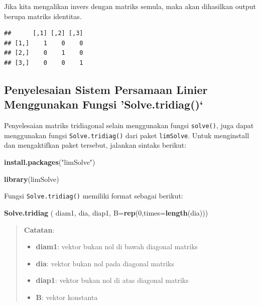\documentclass[]{book}
\newenvironment{Shaded}{\begin{snugshade}}{\end{snugshade}}
\newcommand{\DataTypeTok}[1]{\textcolor[rgb]{0.13,0.29,0.53}{#1}}
\newcommand{\DecValTok}[1]{\textcolor[rgb]{0.00,0.00,0.81}{#1}}
\newcommand{\KeywordTok}[1]{\textcolor[rgb]{0.13,0.29,0.53}{\textbf{#1}}}
\newcommand{\NormalTok}[1]{#1}
\newcommand{\OperatorTok}[1]{\textcolor[rgb]{0.81,0.36,0.00}{\textbf{#1}}}
\newcommand{\StringTok}[1]{\textcolor[rgb]{0.31,0.60,0.02}{#1}}
\providecommand{\tightlist}{%
  \setlength{\itemsep}{0pt}\setlength{\parskip}{0pt}}
\theoremstyle{definition}
\theoremstyle{definition}
\theoremstyle{definition}
\theoremstyle{remark}
\begin{document}
Jika kita mengalikan invers dengan matriks semula, maka akan dihasilkan output berupa matriks identitas.

\begin{Shaded}
\end{Shaded}

\begin{verbatim}
##      [,1] [,2] [,3]
## [1,]    1    0    0
## [2,]    0    1    0
## [3,]    0    0    1
\end{verbatim}

\hypertarget{solvetridiagfunct}{%
\subsection{Penyelesaian Sistem Persamaan Linier Menggunakan Fungsi 'Solve.tridiag()`}\label{solvetridiagfunct}}

Penyelesaian matriks tridiagonal selain menggunakan fungsi \texttt{solve()}, juga dapat menggunakan fungsi \texttt{Solve.tridiag()} dari paket \texttt{limSolve}. Untuk menginstall dan mengaktifkan paket tersebut, jalankan sintaks berikut:

\begin{Shaded}
\begin{Highlighting}[]
\KeywordTok{install.packages}\NormalTok{(}\StringTok{"limSolve"}\NormalTok{)}
\end{Highlighting}
\end{Shaded}

\begin{Shaded}
\begin{Highlighting}[]
\KeywordTok{library}\NormalTok{(limSolve)}
\end{Highlighting}
\end{Shaded}

Fungsi \texttt{Solve.tridiag()} memiliki format sebagai berikut:

\begin{Shaded}
\begin{Highlighting}[]
\KeywordTok{Solve.tridiag}\NormalTok{ ( diam1, dia, diap1, }\DataTypeTok{B=}\KeywordTok{rep}\NormalTok{(}\DecValTok{0}\NormalTok{,}\DataTypeTok{times=}\KeywordTok{length}\NormalTok{(dia)))}
\end{Highlighting}
\end{Shaded}

\begin{quote}
\textbf{Catatan}:

\begin{itemize}
\tightlist
\item
  \textbf{diam1}: vektor bukan nol di bawah diagonal matriks
\item
  \textbf{dia}: vektor bukan nol pada diagonal matriks
\item
  \textbf{diap1}: vektor bukan nol di atas diagonal matriks
\item
  \textbf{B}: vektor konstanta
\end{itemize}
\end{quote}
\end{document}
